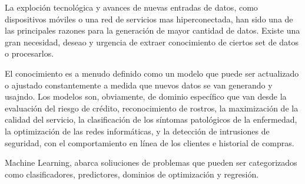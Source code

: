 


La exploción tecnológica y avances de nuevas entradas de datos, como dispositivos móviles o una red de servicios mas hiperconectada, han sido una de las principales razones para la generación de mayor cantidad de datos. Existe una gran necesidad, deseao y urgencia de extraer conocimiento de ciertos set de datos o procesarlos.

El conocimiento es a menudo definido como un modelo que puede ser actualizado o ajustado constantemente a medida que nuevos datos se van generando y usajndo.
Los modelos son, obviamente, de dominio específico que van desde la evaluación del riesgo de crédito, reconocimiento de rostros, la maximización de la calidad del servicio, la clasificación de los síntomas patológicos de la enfermedad, la optimización de las redes informáticas, y la detección de intrusiones de seguridad, con el comportamiento en línea de los clientes e historial de compras.


Machine Learning, abarca soliuciones de problemas que pueden ser categorizados como clasificadores, predictores, dominios de optimización y regresión.

